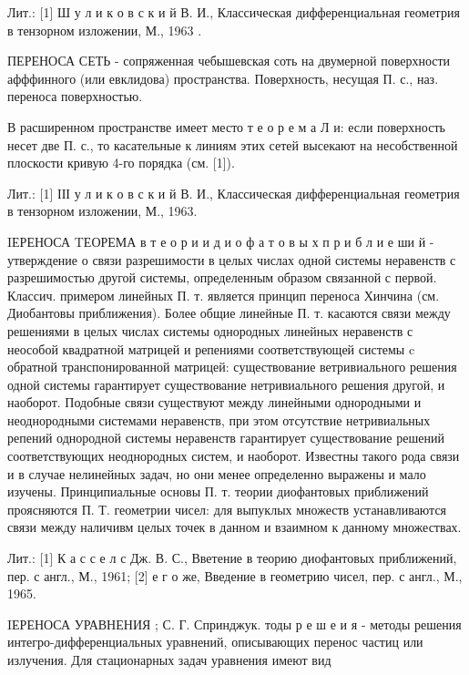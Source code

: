 \documentclass[10pt]{article}
\begin{document}
Лит.: [1] Ш у л и к о в с к и й В. И., Классическая дифференциальная геометрия в тензорном изложении, М., 1963 .



ПЕРЕНОСА СЕТЬ - сопряженная чебышевская соть на двумерной поверхности афффинного (или евклидова) пространства. Поверхность, несущая П. с., наз. переноса поверхностью.



В расширенном пространстве имеет место т е о р е м а Л и: если поверхность несет две П. с., то касательные к линиям этих сетей высекают на несобственной плоскости кривую 4-го порядка (см. [1]).



Лит.: [1] ІІІ у л и к о в с к и й В. И., Классическая дифференциальная геометрия в тензорном изложении, М., 1963.



IЕРЕНОСА TЕОРЕМА в т е о р и и д и о ф а т о в ы х п р и б л и е ши й - утверждение о связи разрешимости в целых числах одной системы неравенств с разрешимостью другой системы, определенным образом связанной с первой. Классич. примером линейных П. т. является принцип переноса Хинчина (см. Диобантовы приближения). Более общие линейные П. т. касаются связи между решениями в целых числах системы однородных линейных неравенств с неособой квадратной матрицей и репениями соответствующей системы $\mathrm{c}$ обратной транспонированной матрицей: существование ветривиального решения одной системы гарантирует существование нетривиального решения другой, и наоборот. Подобные связи существуют между линейными однородными и неоднородными системами неравенств, при этом отсутствие нетривиальных репений однородной системы неравенств гарантирует существование решений соответствующих неоднородных систем, и наоборот. Известны такого рода связи и в случае нелинейных задач, но они менее определенно выражены и мало изучены. Принципиальные основы П. т. теории диофантовых приближений проясняются П. Т. геометрии чисел: для выпуклых множеств устанавливаются связи между наличивм целых точек в данном и взаимном к данному множествах.



Лит.: [1] К а с с е л с Дж. В. С., Вветение в теорию диофантовых приближений, пер. с англ., М., 1961; [2] е г о же, Введение в геометрию чисел, пер. с англ., М., 1965.



IЕРЕНОСА УРАВНЕНИЯ ; С. Г. Спринджук. тоды р е ш е и я - методы решения интегро-дифференциальных уравнений, описывающих перенос частиц или излучения. Для стационарных задач уравнения имеют вид
\end{document}
